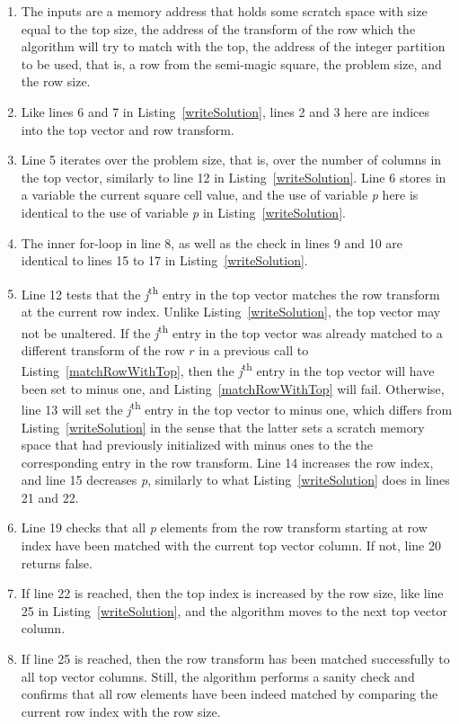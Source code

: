 \begin{enumerate}
\item The inputs are a memory address that holds some scratch space with size equal to the top size, the address of the transform of the row which the algorithm will try to match with the top, the address of the integer partition to be used, that is, a row from the semi-magic square, the problem size, and the row size.
\item Like lines 6 and 7 in Listing~\ref{writeSolution}, lines 2 and 3 here are indices into the top vector and row transform. 
\addtocounter{enumi}{2}
\item Line 5 iterates over the problem size, that is, over the number of columns in the top vector, similarly to line 12 in Listing~\ref{writeSolution}. Line 6 stores in a variable the current square cell value, and the use of variable \emph{p} here is identical to the use of variable \emph{p} in Listing~\ref{writeSolution}.
\addtocounter{enumi}{2}
\item The inner for-loop in line 8, as well as the check in lines 9 and 10 are identical to lines 15 to 17 in Listing~\ref{writeSolution}.
\addtocounter{enumi}{3}
\item Line 12 tests that the \emph{j}\textsuperscript{th} entry in the top vector matches the row transform at the current row index. Unlike Listing~\ref{writeSolution}, the top vector may not be unaltered. If the \emph{j}\textsuperscript{th} entry in the top vector was already matched to a different transform of the row $r$ in a previous call to Listing~\ref{matchRowWithTop}, then the \emph{j}\textsuperscript{th} entry in the top vector will have been set to minus one, and Listing~\ref{matchRowWithTop} will fail. Otherwise, line 13 will set the \emph{j}\textsuperscript{th} entry in the top vector to minus one, which differs from Listing~\ref{writeSolution} in the sense that the latter sets a scratch memory space that had previously initialized with minus ones to the the corresponding entry in the row transform. Line 14 increases the row index, and line 15 decreases \emph{p}, similarly to what Listing~\ref{writeSolution} does in lines 21 and 22.
\addtocounter{enumi}{6}
\item Line 19 checks that all \emph{p} elements from the row transform starting at row index have been matched with the current top vector column. If not, line 20 returns false.
\addtocounter{enumi}{2}
\item If line 22 is reached, then the top index is increased by the row size, like line 25 in Listing~\ref{writeSolution}, and the algorithm moves to the next top vector column.
\addtocounter{enumi}{2}
\item If line 25 is reached, then the row transform has been matched successfully to all top vector columns. Still, the algorithm performs a sanity check and confirms that all row elements have been indeed matched by comparing the current row index with the row size.
\end{enumerate}

